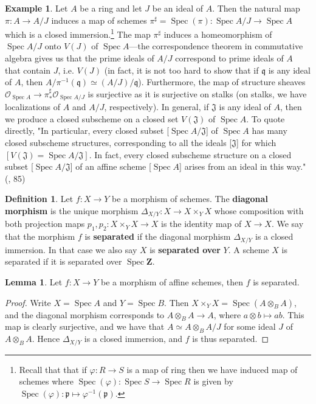 \documentclass[oneside]{amsart}
\theoremstyle{definition}
\newtheorem{defi}{Definition}[section]
\newtheorem{lemma}{Lemma}[section]
\DeclareMathOperator{\spec}{Spec}
\newtheorem{ex}{Example}[section]
\newcommand{\zz}{\mathbf Z}
\begin{document}
\begin{ex} Let $A$ be a ring and let $J$ be an ideal of $A$. Then the natural map $\pi \colon A \to A / J$ induces a map of schemes $ \pi^\sharp = \spec ( \pi) \colon \spec A/J \to \spec A$ which is a closed immersion.\footnote{ Recall that that if $\varphi \colon R \to S$ is a map of ring then we have induced map of schemes where $\spec (\varphi) \colon \spec S \to \spec R$ is given by $\spec (\varphi) \colon \mathfrak p \mapsto \varphi^{-1} (\mathfrak p)$. } The map $\pi^\sharp$  induces a homeomorphism of $ \spec A/J $ onto $V( J)$ of $\spec A$---the correspondence theorem in commutative algebra gives us that the prime ideals of $A/J$ correspond to prime ideals of $A$ that contain $J$, i.e. $V(J)$ (in fact, it is not too hard to show that if $\mathfrak q$ is any ideal of $A$, then $A / \pi ^{-1}(\mathfrak q) \simeq (A/J)/\mathfrak q $). Furthermore, the map of structure sheaves $\mathscr O_{\spec A} \to \pi^\sharp_\ast \mathscr O_{\spec A/J} $ is surjective as it is surjective on stalks (on stalks, we have localizations of $A$ and $A/J$, respectively). In general, if $\mathfrak J$ is any ideal of $A$, then we produce a closed subscheme on a closed set $V(\mathfrak J)$ of $\spec A$. To quote directly, "In particular, every closed subset [$\spec A/\mathfrak J$] of $\spec A$ has many closed subscheme structures, corresponding to all the ideals [$\mathfrak J$] for which $[V(\mathfrak J)  = \spec A / \mathfrak J]$. In fact, every closed subscheme structure on a closed subset [$\spec A/\mathfrak J$] of an affine scheme [$\spec A$] arises from an ideal in this way." (, 85)
\end{ex}

\begin{defi} Let $f \colon X \to Y$ be a morphism of schemes. The \textbf{diagonal morphism} is the unique morphism $\Delta_{X/Y} \colon X  \to  X \times_Y X$ whose composition with both projection maps $p_1,p_2:X \times_Y X \to X$ is the identity map of $X \to X$. We say that the morphism $f$ is \textbf{separated} if the diagonal morphism $\Delta_{X/Y}$ is a closed immersion. In that case we also say $X$ is \textbf{separated over} $Y$. A scheme $X$ is separated if it is separated over $\spec \zz$.	
\end{defi}
\begin{lemma}
	Let $f \colon X \to Y$ be a morphism of affine schemes, then $f$ is separated. 
\end{lemma}
\begin{proof}
	Write $X = \spec A$ and $Y = \spec B$. Then $X \times_Y X = \spec (A \otimes_B A)$, and the diagonal morphism corresponds to $A \otimes_B A \to A$, where $a \otimes b \mapsto ab$. This map is clearly surjective, and we have that $A \simeq A \otimes_B A/J$ for some ideal $J$ of $A \otimes_B A$. Hence $\Delta_{X/Y}$ is a closed immersion, and $f$ is thus separated. 
\end{proof}
\end{document}
